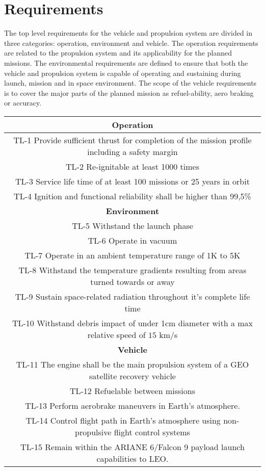 \chapter{Requirements}
\qquad The top level requirements for the vehicle and propulsion system are divided in three categories: operation, environment and vehicle. The operation requirements are related to the propulsion system and its applicability for the planned missions. The environmental requirements are defined to ensure that both the vehicle and propulsion system is capable of operating and sustaining during launch, mission and in space environment. The scope of the vehicle requirements is to cover the major parts of the planned mission as refuel-ability, aero braking or accuracy. \\
\noindent
\begin{table}
\begin{tabular}{|c|}
	\hline
	\cellcolor{blue!60}\textbf{Operation}\\
	\hline
	\cellcolor{blue!15} TL-1 Provide sufficient thrust for completion of the mission profile including a safety margin\\
	\hline
	\cellcolor{blue!15} TL-2 Re-ignitable at least 1000 times\\
	\hline
	\cellcolor{blue!15} TL-3 Service life time of at least 100 missions or 25 years in orbit\\
	\hline
	\cellcolor{blue!15} TL-4 Ignition and functional reliability shall be higher than 99,5\%\\

	\hline
	\cellcolor{blue!60}\textbf{Environment}\\
	\hline
	\cellcolor{blue!15} TL-5 Withstand the launch phase
	\\
	\hline
	\cellcolor{blue!15} TL-6 Operate in vacuum
	\\
	\hline
	\cellcolor{blue!15} TL-7 Operate in an ambient temperature range of 1K to 5K
	\\
	\hline
	\cellcolor{blue!15} TL-8 Withstand the temperature gradients resulting from areas turned towards or away
	\\
	\hline
	\cellcolor{blue!15} TL-9 Sustain space-related radiation throughout it's complete life time
	
	\\
	\hline
	\cellcolor{blue!15} TL-10 Withstand debris impact of under 1cm diameter with a max relative speed of $15$ km/s 	
	\\
	\hline
	\cellcolor{blue!60}\textbf{Vehicle}\\
	\hline
	\cellcolor{blue!15} TL-11 The engine shall be the main propulsion system of a GEO satellite recovery vehicle
	\\
	\hline
	\cellcolor{blue!15} TL-12 Refuelable between missions
	\\
	\hline
	\cellcolor{blue!15} TL-13 Perform aerobrake maneuvers in Earth's atmosphere.
	\\
	\hline
	\cellcolor{blue!15} TL-14 Control \space flight path in  Earth's atmosphere  using non-propulsive flight control systems
	\\
	\cellcolor{blue!15} TL-15 Remain within the ARIANE 6/Falcon 9 payload launch capabilities to LEO.
	

\end{tabular}
\end{table}

